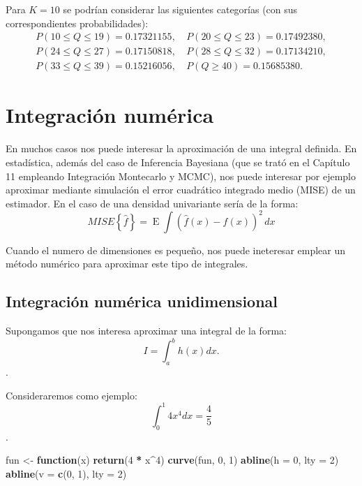 \documentclass[
]{book}
\newenvironment{Shaded}{\begin{snugshade}}{\end{snugshade}}
\newcommand{\ControlFlowTok}[1]{\textcolor[rgb]{0.13,0.29,0.53}{\textbf{#1}}}
\newcommand{\DataTypeTok}[1]{\textcolor[rgb]{0.13,0.29,0.53}{#1}}
\newcommand{\DecValTok}[1]{\textcolor[rgb]{0.00,0.00,0.81}{#1}}
\newcommand{\KeywordTok}[1]{\textcolor[rgb]{0.13,0.29,0.53}{\textbf{#1}}}
\newcommand{\NormalTok}[1]{#1}
\newcommand{\OperatorTok}[1]{\textcolor[rgb]{0.81,0.36,0.00}{\textbf{#1}}}
\newcommand{\StringTok}[1]{\textcolor[rgb]{0.31,0.60,0.02}{#1}}
\theoremstyle{break}
\theoremstyle{definition}
\theoremstyle{definition}
\theoremstyle{definition}
\theoremstyle{remark}
\begin{document}
Para \(K=10\) se podrían considerar las siguientes categorías (con sus correspondientes probabilidades):
\[\begin{array}{rr}
P( 10 \leq Q \leq 19 ) = 0.17321155, \ & P( 20 \leq Q \leq 23 ) = 0.17492380,\\
P( 24 \leq Q \leq 27 ) = 0.17150818, \ & P( 28 \leq Q \leq 32 ) = 0.17134210,\\
P( 33 \leq Q \leq 39 ) = 0.15216056, \ & P( Q \geq 40 ) =0.15685380.
\end{array}\]

\hypertarget{int-num}{%
\chapter{Integración numérica}\label{int-num}}

En muchos casos nos puede interesar la aproximación de una integral definida.
En estadística, además del caso de Inferencia Bayesiana (que se trató en el Capítulo 11
empleando Integración Montecarlo y MCMC), nos puede interesar por ejemplo aproximar mediante
simulación el error cuadrático integrado medio (MISE) de un estimador.
En el caso de una densidad univariante sería de la forma:
\[MISE \left\{ \hat{f} \right\} = \operatorname{E}\int (\hat{f}(x)-f(x))^2 \, dx\]

Cuando el numero de dimensiones es pequeño, nos puede ineteresar emplear un método numérico
para aproximar este tipo de integrales.

\hypertarget{integraciuxf3n-numuxe9rica-unidimensional}{%
\section{Integración numérica unidimensional}\label{integraciuxf3n-numuxe9rica-unidimensional}}

Supongamos que nos interesa aproximar una integral de la forma:
\[I = \int_a^b h(x)  dx.\].

Consideraremos como ejemplo:
\[\int_0^1 4x^4 dx = \frac{4}{5}\].

\begin{Shaded}
\begin{Highlighting}[]
\NormalTok{fun <-}\StringTok{ }\ControlFlowTok{function}\NormalTok{(x) }\KeywordTok{return}\NormalTok{(}\DecValTok{4} \OperatorTok{*}\StringTok{ }\NormalTok{x}\OperatorTok{^}\DecValTok{4}\NormalTok{)}
\KeywordTok{curve}\NormalTok{(fun, }\DecValTok{0}\NormalTok{, }\DecValTok{1}\NormalTok{)}
\KeywordTok{abline}\NormalTok{(}\DataTypeTok{h =} \DecValTok{0}\NormalTok{, }\DataTypeTok{lty =} \DecValTok{2}\NormalTok{)}
\KeywordTok{abline}\NormalTok{(}\DataTypeTok{v =} \KeywordTok{c}\NormalTok{(}\DecValTok{0}\NormalTok{, }\DecValTok{1}\NormalTok{), }\DataTypeTok{lty =} \DecValTok{2}\NormalTok{)}
\end{Highlighting}
\end{Shaded}
\end{document}
